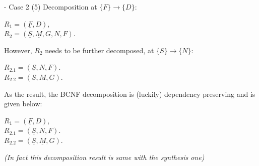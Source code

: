 \begin{frame}[fragile]{ - Case 2}
	(5) Decomposition at $\{F\} \rightarrow \{D\}$:\\\vspace{5pt}
	
	$R_1 = (\underline{F}, D),$\\
	$R_2 = (\underline{S}, \underline{M}, G, N, F).$\\\vspace{5pt}
	
	However, $R_2$ needs to be further decomposed, at $\{S\} \rightarrow \{N\}$:\\\vspace{5pt}
	
	$R_{2.1} = (\underline{S}, N, F).$\\
	$R_{2.2} = (\underline{S}, \underline{M}, G).$\\\vspace{5pt}
	
	As the result, the BCNF decomposition is (luckily) dependency preserving and is given below:\\\vspace{5pt}
	
	$R_1 = (\underline{F}, D),$\\
	$R_{2.1} = (\underline{S}, N, F).$\\
	$R_{2.2} = (\underline{S}, \underline{M}, G).$\\\vspace{5pt}
	
	\textit{(In fact this decomposition result is same with the synthesis one)}
\end{frame}

